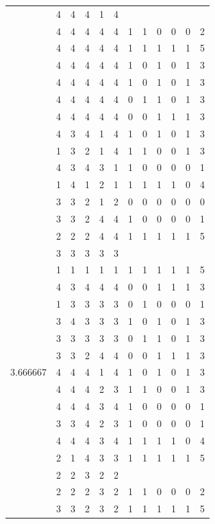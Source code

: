 \documentclass[]{book}
\theoremstyle{definition}
\theoremstyle{definition}
\theoremstyle{definition}
\theoremstyle{remark}
\begin{document}
\begin{table}
{\begin{tabular}[t]{rrrrrrrrrrrr}
 & 4 & 4 & 4 & 1 & 4 &  &  &  &  &  & \\
 & 4 & 4 & 4 & 4 & 4 & 1 & 1 & 0 & 0 & 0 & 2\\
 & 4 & 4 & 4 & 4 & 4 & 1 & 1 & 1 & 1 & 1 & 5\\
 & 4 & 4 & 4 & 4 & 4 & 1 & 0 & 1 & 0 & 1 & 3\\
 & 4 & 4 & 4 & 4 & 4 & 1 & 0 & 1 & 0 & 1 & 3\\
 & 4 & 4 & 4 & 4 & 4 & 0 & 1 & 1 & 0 & 1 & 3\\
 & 4 & 4 & 4 & 4 & 4 & 0 & 0 & 1 & 1 & 1 & 3\\
 & 4 & 3 & 4 & 1 & 4 & 1 & 0 & 1 & 0 & 1 & 3\\
 & 1 & 3 & 2 & 1 & 4 & 1 & 1 & 0 & 0 & 1 & 3\\
 & 4 & 3 & 4 & 3 & 1 & 1 & 0 & 0 & 0 & 0 & 1\\
 & 1 & 4 & 1 & 2 & 1 & 1 & 1 & 1 & 1 & 0 & 4\\
 & 3 & 3 & 2 & 1 & 2 & 0 & 0 & 0 & 0 & 0 & 0\\
 & 3 & 3 & 2 & 4 & 4 & 1 & 0 & 0 & 0 & 0 & 1\\
 & 2 & 2 & 2 & 4 & 4 & 1 & 1 & 1 & 1 & 1 & 5\\
 & 3 & 3 & 3 & 3 & 3 &  &  &  &  &  & \\
 & 1 & 1 & 1 & 1 & 1 & 1 & 1 & 1 & 1 & 1 & 5\\
 & 4 & 3 & 4 & 4 & 4 & 0 & 0 & 1 & 1 & 1 & 3\\
 & 1 & 3 & 3 & 3 & 3 & 0 & 1 & 0 & 0 & 0 & 1\\
 & 3 & 4 & 3 & 3 & 3 & 1 & 0 & 1 & 0 & 1 & 3\\
 & 3 & 3 & 3 & 3 & 3 & 0 & 1 & 1 & 0 & 1 & 3\\
 & 3 & 3 & 2 & 4 & 4 & 0 & 0 & 1 & 1 & 1 & 3\\
3.666667 & 4 & 4 & 4 & 1 & 4 & 1 & 0 & 1 & 0 & 1 & 3\\
 & 4 & 4 & 4 & 2 & 3 & 1 & 1 & 0 & 0 & 1 & 3\\
 & 4 & 4 & 4 & 3 & 4 & 1 & 0 & 0 & 0 & 0 & 1\\
 & 3 & 3 & 4 & 2 & 3 & 1 & 0 & 0 & 0 & 0 & 1\\
 & 4 & 4 & 4 & 3 & 4 & 1 & 1 & 1 & 1 & 0 & 4\\
 & 2 & 1 & 4 & 3 & 3 & 1 & 1 & 1 & 1 & 1 & 5\\
 & 2 & 2 & 3 & 2 & 2 &  &  &  &  &  & \\
 & 2 & 2 & 2 & 3 & 2 & 1 & 1 & 0 & 0 & 0 & 2\\
 & 3 & 3 & 2 & 3 & 2 & 1 & 1 & 1 & 1 & 1 & 5\\

\end{tabular}}
\end{table}
\end{document}
